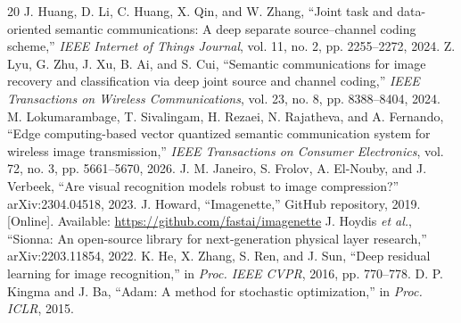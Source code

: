 \documentclass[conference]{IEEEtran}
\begin{document}
\begin{thebibliography}{20}
 J. Huang, D. Li, C. Huang, X. Qin, and W. Zhang, ``Joint task and data-oriented semantic communications: A deep separate source--channel coding scheme,'' \emph{IEEE Internet of Things Journal}, vol. 11, no. 2, pp. 2255--2272, 2024.
 Z. Lyu, G. Zhu, J. Xu, B. Ai, and S. Cui, ``Semantic communications for image recovery and classification via deep joint source and channel coding,'' \emph{IEEE Transactions on Wireless Communications}, vol. 23, no. 8, pp. 8388--8404, 2024.
 M. Lokumarambage, T. Sivalingam, H. Rezaei, N. Rajatheva, and A. Fernando, ``Edge computing-based vector quantized semantic communication system for wireless image transmission,'' \emph{IEEE Transactions on Consumer Electronics}, vol. 72, no. 3, pp. 5661--5670, 2026.
 J. M. Janeiro, S. Frolov, A. El-Nouby, and J. Verbeek, ``Are visual recognition models robust to image compression?'' arXiv:2304.04518, 2023.
 J. Howard, ``Imagenette,'' GitHub repository, 2019. [Online]. Available: \url{https://github.com/fastai/imagenette}
 J. Hoydis \emph{et al.}, ``Sionna: An open-source library for next-generation physical layer research,'' arXiv:2203.11854, 2022.
 K. He, X. Zhang, S. Ren, and J. Sun, ``Deep residual learning for image recognition,'' in \emph{Proc. IEEE CVPR}, 2016, pp. 770--778.
 D. P. Kingma and J. Ba, ``Adam: A method for stochastic optimization,'' in \emph{Proc. ICLR}, 2015.
\end{thebibliography}
\end{document}
